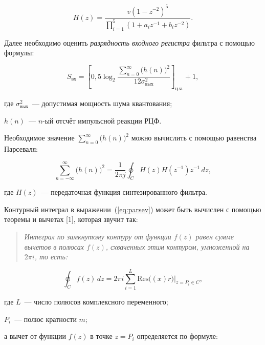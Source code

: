 \begin{equation}
  \label{eq:pered_kanon}
  H(z) = \frac{v(1 - z^{-2})^5}{\prod_{i=1}^5\left(1 + a_i z^{-1} +b_i
    z^{-2}\right)}.
\end{equation}

\point Далее необходимо оценить \textit{разрядность входного регистра}
фильтра с помощью формулы:

\begin{equation}
  \label{eq:rekurs_razr}
  S_{\text{вх}} = \left[0{,}5 \log_2 \frac{\displaystyle
      \sum_{n=0}^{\infty} \bigl(h(n)\bigr)^2}{12
      \sigma^2_{\text{вых}}}\right]_{\text{ц.ч.}} + 1,
\end{equation}

\begin{ESKDexplanation}
\item[где ] $\sigma^2_{\text{вых}}$~--- допустимая мощность шума
  квантования;
\item $h(n)$~--- $n$-ый отсчёт импульсной реакции РЦФ.
\end{ESKDexplanation}

Необходимое значение $\sum_{n=0}^{\infty} \bigl(h(n)\bigr)^2$ можно
вычислить с помощью равенства Парсеваля:

\begin{equation}
  \label{eq:parsev}
  \sum_{n = -\infty}^{\infty}\bigl(h(n)\bigr)^2 = \frac{1}{2 \pi j}
  \oint_{C} H(z) H(z^{-1}) z^{-1} \, dz,
\end{equation}

\begin{ESKDexplanation}
\item[где ] $H(z)$~--- передаточная функция синтезированного фильтра.
\end{ESKDexplanation}

Контурный интеграл в выражении~(\ref{eq:parsev}) может быть вычислен с
помощью теоремы и вычетах [1], которая звучит так:

\begin{quote}
  \textit{Интеграл по замкнутому контуру от функции $f(z)$ равен сумме вычетов в
  полюсах $f(z)$, схваченных этим контуром, умноженной на $2\pi i$, то есть:}
\end{quote}

\begin{equation}
  \label{eq:kont_int}
  \oint_{C}f(z) \, dz = 2\pi i \sum_{i=1}^{L}
  \text{Res}\bigl((x)r\bigr)\Big|_{z = P_i \in C},
\end{equation}

\begin{ESKDexplanation}
\item[где ] $L$~--- число полюсов комплексного переменного;
\item $P_i$~--- полюс кратности $m$;
\item а вычет от функции $f(z)$ в точке $z = P_i$ определяется по формуле:
\end{ESKDexplanation}

